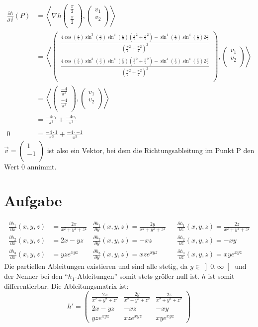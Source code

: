 \documentclass[10pt,a4paper,parskip=half]{scrartcl}
\newcommand{\vectwo}[2]{\left(\begin {array} {c}#1\\#2\\\end {array} \right)}
\begin{document}
\begin{enumerate}[(i)]
\begin{align*}
\frac{\partial h}{\partial \vec v} (P) &= \left< \nabla h \vectwo{\frac{\pi}{2}}{\frac{\pi}{2}}, \vectwo{v_1}{v_2} \right>\\
 &= \left< \vectwo{\frac{4\cos(\frac{\pi}{2})\sin^3(\frac{\pi}{2})\sin^4(\frac{\pi}{2})(\frac{\pi}{2}^2 + \frac{\pi}{2}^2) - \sin^4(\frac{\pi}{2})\sin^4(\frac{\pi}{2})2\frac{\pi}{2}}{(\frac{\pi}{2}^2 + \frac{\pi}{2}^2)^2}}{\frac{4\cos(\frac{\pi}{2})\sin^3(\frac{\pi}{2})\sin^4(\frac{\pi}{2})(\frac{\pi}{2}^2 + \frac{\pi}{2}^2) - \sin^4(\frac{\pi}{2})\sin^4(\frac{\pi}{2})2\frac{\pi}{2}}{(\frac{\pi}{2}^2 + \frac{\pi}{2}^2)^2}}, \vectwo{v_1}{v_2} \right>\\
 &= \left< \vectwo{\frac{-4}{\pi^3}}{\frac{-4}{\pi^3}}, \vectwo{v_1}{v_2} \right> \\
 &= \frac{-4v_1}{\pi^3} + \frac{-4v_2}{\pi^3} \\ \\
 0 &= \frac{-4 \cdot 1}{\pi^3} + \frac{-4 \cdot -1}{\pi^3}
\end{align*}
$\vec v = \vectwo{1}{-1}$ ist also ein Vektor, bei dem die Richtungsableitung im Punkt P den Wert 0 annimmt.

\section{Aufgabe}
\begin{align*}
\frac{\partial h_1}{\partial x}(x,y,z) &= \frac {2x}{x^2+y^2+z^2} &\frac{\partial h_1}{\partial y}(x,y,z) = \frac{2y}{x^2+y^2+z^2} &&\frac{\partial h_1}{\partial z}(x,y,z) = \frac{2z}{x^2+y^2+z^2}\\
\frac{\partial h_2}{\partial x}(x,y,z) &= 2x-yz &\frac{\partial h_2}{\partial y}(x,y,z) = -xz &&\frac{\partial h_2}{\partial z}(x,y,z) = -xy\\
\frac{\partial h_3}{\partial x}(x,y,z) &= yze^{xyz} &\frac{\partial h_3}{\partial y}(x,y,z) = xze^{xyz} &&\frac{\partial h_3}{\partial z}(x,y,z) = xye^{xyz}
\end{align*}
Die partiellen Ableitungen existieren und sind alle stetig, da $y \in \left]0,\infty\right[$ und der Nenner bei den ``$h_1$-Ableitungen'' somit stets größer null ist. $h$ ist somit differentierbar.
Die Ableitungsmatrix ist:
$$h' =\begin{pmatrix}
\frac{2x}{x^2 + y^2 + z^2} & \frac{2y}{x^2 + y^2 + z^2} & \frac{2z}{x^2 + y^2 + z^2} \\
2x - yz & -xz & -xy \\
yze^{xyz}  & xze^{xyz} & xye^{xyz} 
\end{pmatrix}  $$


\end{enumerate}
\end{document}
